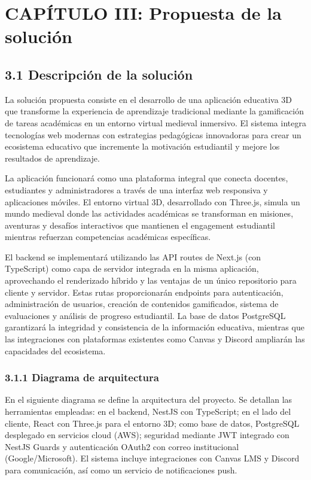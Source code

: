 \section{CAPÍTULO III: Propuesta de la solución}

\subsection{3.1 Descripción de la solución}
La solución propuesta consiste en el desarrollo de una aplicación educativa 3D que transforme la experiencia de aprendizaje tradicional mediante la gamificación de tareas académicas en un entorno virtual medieval inmersivo. El sistema integra tecnologías web modernas con estrategias pedagógicas innovadoras para crear un ecosistema educativo que incremente la motivación estudiantil y mejore los resultados de aprendizaje.

La aplicación funcionará como una plataforma integral que conecta docentes, estudiantes y administradores a través de una interfaz web responsiva y aplicaciones móviles. El entorno virtual 3D, desarrollado con Three.js, simula un mundo medieval donde las actividades académicas se transforman en misiones, aventuras y desafíos interactivos que mantienen el engagement estudiantil mientras refuerzan competencias académicas específicas.

El backend se implementará utilizando las API routes de Next.js (con TypeScript) como capa de servidor integrada en la misma aplicación, aprovechando el renderizado híbrido y las ventajas de un único repositorio para cliente y servidor. Estas rutas proporcionarán endpoints para autenticación, administración de usuarios, creación de contenidos gamificados, sistema de evaluaciones y análisis de progreso estudiantil. La base de datos PostgreSQL garantizará la integridad y consistencia de la información educativa, mientras que las integraciones con plataformas existentes como Canvas y Discord ampliarán las capacidades del ecosistema.

\subsubsection{3.1.1 Diagrama de arquitectura}
En el siguiente diagrama se define la arquitectura del proyecto. Se detallan las herramientas empleadas: en el backend, NestJS con TypeScript; en el lado del cliente, React con Three.js para el entorno 3D; como base de datos, PostgreSQL desplegado en servicios cloud (AWS); seguridad mediante JWT integrado con NestJS Guards y autenticación OAuth2 con correo institucional (Google/Microsoft). El sistema incluye integraciones con Canvas LMS y Discord para comunicación, así como un servicio de notificaciones push.

